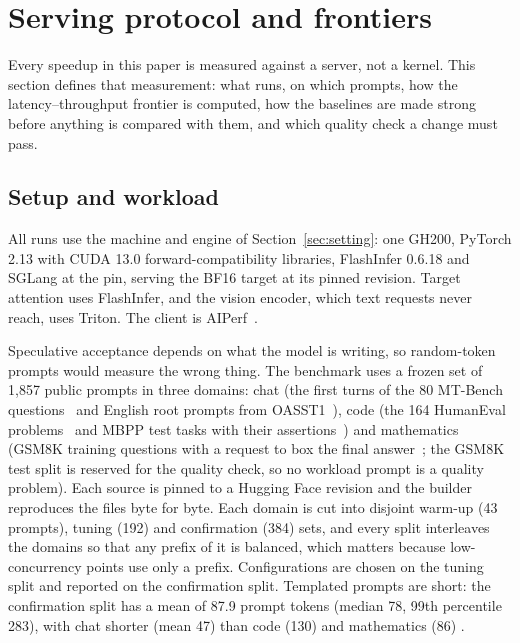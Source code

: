\section{Serving protocol and frontiers}\label{sec:serving}
Every speedup in this paper is measured against a server, not a kernel. This section defines that measurement: what runs, on which prompts, how the latency--throughput frontier is computed, how the baselines are made strong before anything is compared with them, and which quality check a change must pass.

\subsection{Setup and workload}\label{sec:serving-setup}
All runs use the machine and engine of Section~\ref{sec:setting}: one GH200, PyTorch 2.13 with CUDA 13.0 forward-compatibility libraries, FlashInfer 0.6.18 and SGLang at the pin, serving the BF16 target at its pinned revision. Target attention uses FlashInfer, and the vision encoder, which text requests never reach, uses Triton. The client is AIPerf~\cite{aiperf}.

Speculative acceptance depends on what the model is writing, so random-token prompts would measure the wrong thing. The benchmark uses a frozen set of 1,857 public prompts in three domains: chat (the first turns of the 80 MT-Bench questions~\cite{mtbench} and English root prompts from OASST1~\cite{oasst1}), code (the 164 HumanEval problems~\cite{humaneval} and MBPP test tasks with their assertions~\cite{mbpp}) and mathematics (GSM8K training questions with a request to box the final answer~\cite{gsm8k}; the GSM8K test split is reserved for the quality check, so no workload prompt is a quality problem). Each source is pinned to a Hugging Face revision and the builder reproduces the files byte for byte. Each domain is cut into disjoint warm-up (43 prompts), tuning (192) and confirmation (384) sets, and every split interleaves the domains so that any prefix of it is balanced, which matters because low-concurrency points use only a prefix. Configurations are chosen on the tuning split and reported on the confirmation split. Templated prompts are short: the confirmation split has a mean of 87.9 prompt tokens (median 78, 99th percentile 283), with chat shorter (mean 47) than code (130) and mathematics (86) .

